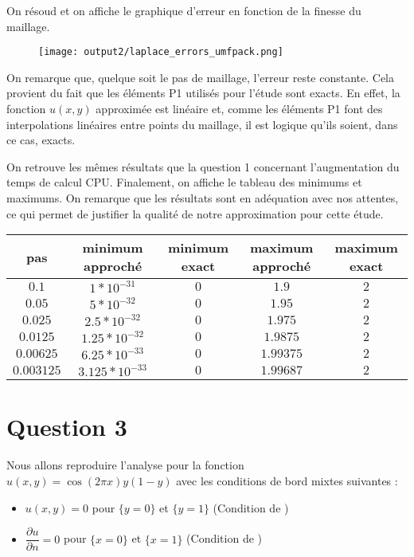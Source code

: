 \documentclass[11pt,a4paper]{report}
\begin{document}
			On résoud et on affiche le graphique d'erreur en fonction de la finesse du maillage. 
			
			\begin{figure}[H]
				\centering
				\texttt{[image: output2/laplace\_errors\_umfpack.png]}
			\end{figure}
	
			On remarque que, quelque soit le pas de maillage, l'erreur reste constante. Cela provient du fait que les éléments P1 utilisés pour l'étude sont exacts. En effet, la fonction $u(x,y)$ approximée est linéaire et, comme les éléments P1 font des interpolations linéaires entre points du maillage, il est logique qu'ils soient, dans ce cas, exacts.
			
			On retrouve les mêmes résultats que la question 1 concernant l'augmentation du temps de calcul CPU. Finalement, on affiche le tableau des minimums et maximums. On remarque que les résultats sont en adéquation avec nos attentes, ce qui permet de justifier la qualité de notre approximation pour cette étude.
					
			\begin{center}
				\begin{tabular}{|c|c|c|c|c|}
					\hline
					pas & minimum approché & minimum exact & maximum approché & maximum exact \\
					\hline 
					$0.1$ & $1*10^{-31}$ & $0$ & $1.9$ & $2$\\ 
					\hline 
					$0.05$ & $5*10^{-32}$ & $0$ & $1.95$ & $2$\\ 
					\hline 
					$0.025$ & $2.5*10^{-32}$ & $0$ & $1.975$ & $2$  \\ 
					\hline 
					$0.0125$ & $1.25*10^{-32}$ & $0$ & $1.9875$ & $2$\\ 
					\hline 
					$0.00625$ & $6.25*10^{-33}$ & $0$ & $1.99375$ & $2$ \\ 
					\hline 
					$0.003125$ & $3.125*10^{-33}$ & $0$ & $1.99687$ & $2$ \\ 
					\hline 
				\end{tabular} 
			\end{center}
	
		

		\section*{Question 3}
			
			Nous allons reproduire l'analyse pour la fonction $u(x,y) = \cos(2\pi x)y(1-y)$ avec les conditions de bord mixtes suivantes : 
			\begin{itemize}
				\item $u(x,y) = 0$ pour $\{y = 0\}$ et $\{y = 1\}$ (Condition de )
				\item $\dfrac{\partial u }{\partial n} = 0$ pour $\{x = 0\}$ et $\{x = 1\}$ (Condition de )
			\end{itemize}
		
\end{document}
